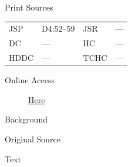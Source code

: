 			\begin{description}
					\item[Print Sources]
				\end{description}

					\begin{tabular}{p{0.5in}p{1in}p{0.5in}p{1in}}
					JSP	 	& D4:52--59		& JSR 		& --- \\
					DC	 	& --- 		& HC 		& --- \\
					HDDC 	& ---		& TCHC 		& --- \\
					\end{tabular}
				
				\begin{description}
					\item[Online Access] \href{https://www.josephsmithpapers.org/paper-summary/letter-to-emma-smith-4-june-1834/1}{Here}
				\end{description}
				
				\begin{description}
					\item[Background]
				\end{description}
				
				
				\begin{description}
					\item[Original Source]
				\end{description}
				
				
				\begin{description}
					\item[Text]
				\end{description}
				
